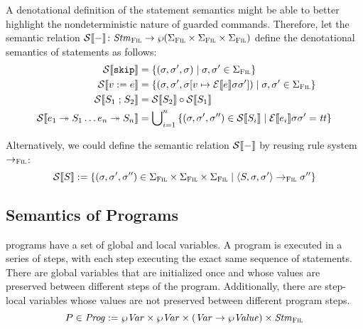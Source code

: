 \documentclass[a4paper,10pt,english]{article}
\begin{document}
A denotational definition of the statement semantics might be able to better highlight the nondeterministic nature of guarded
commands. Therefore, let the semantic relation $\mathcal{S} \llbracket - \rrbracket \colon \mathit{Stm}_\textsc{Fil} \rightarrow \wp (\Sigma_\textsc{Fil} \times \Sigma_\textsc{Fil} \times
\Sigma_\textsc{Fil})$ define the denotational semantics of statements as follows:
\begin{align*}
	\mathcal{S} \llbracket \mathtt{skip} \rrbracket &= \{ (\sigma, \sigma', \sigma) \mid \sigma, \sigma' \in \Sigma_\textsc{Fil} \}
	\\
	\mathcal{S} \llbracket v\; \mathtt{:=}\; e \rrbracket &= \{ (\sigma, \sigma', \sigma[v \mapsto \mathcal{E} \llbracket e \rrbracket \sigma
	\sigma']) \mid \sigma, \sigma' \in \Sigma_\textsc{Fil} \}
	\\
	\mathcal{S} \llbracket S_1 \; \mathtt{;} \; S_2 \rrbracket &= \mathcal{S} \llbracket S_2 \rrbracket \circ \mathcal{S} \llbracket S_1 \rrbracket
	\\
	\mathcal{S} \llbracket e_1 \; \mathtt{\twoheadrightarrow} \; S_1 \ldots e_n \; \mathtt{\twoheadrightarrow} \; S_n \rrbracket &= 
		\bigcup\nolimits_{i = 1}^n \,
		\{ (\sigma, \sigma', \sigma'') \in \mathcal{S} \llbracket S_i \rrbracket \mid \mathcal{E} \llbracket e_i \rrbracket \sigma \sigma' = \mathit{tt} \}
\end{align*}

Alternatively, we could define the semantic relation $\mathcal{S} \llbracket - \rrbracket$ by reusing rule system $\rightarrow_{\textsc{Fil}}$:
\begin{equation*}
	\mathcal{S} \llbracket S \rrbracket := \{ (\sigma, \sigma', \sigma'') \in \Sigma_\textsc{Fil} \times \Sigma_\textsc{Fil} \times \Sigma_\textsc{Fil} \mid
	\langle S, \sigma, \sigma' \rangle \rightarrow_{\textsc{Fil}} \sigma'' \}
\end{equation*}

\subsection{Semantics of \Fil Programs}

\Fil programs have a set of global and local variables. A \Fil program is executed in a series of steps, with each step executing
the exact same sequence of statements. There are global variables that are initialized once and whose values are preserved between
different steps of the program. Additionally, there are step-local variables whose values are not preserved between different
program steps.
\begin{equation*}
	P \in \mathit{Prog} := \wp \mathit{Var} \times \wp \mathit{Var} \times (\mathit{Var} \rightarrow \wp \mathit{Value}) \times \mathit{Stm}_\textsc{Fil}
\end{equation*}
\end{document}
